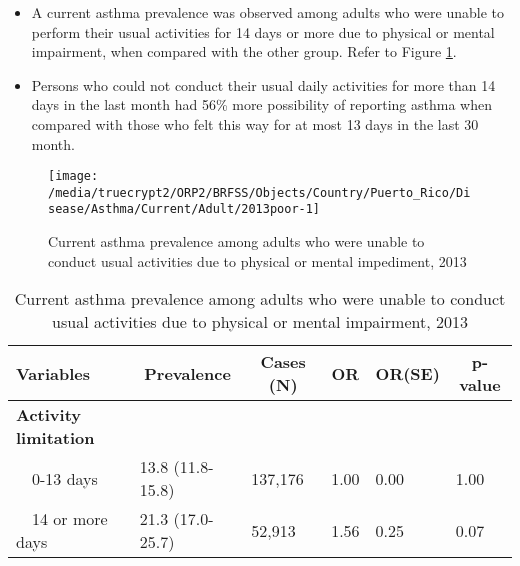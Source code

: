  \newpage
\begin{itemize}

\item A  
current asthma prevalence was observed among adults who were unable to perform their usual activities for 14 days or more due to physical or mental impairment, when compared with the other group. Refer to Figure \ref{fig:poor.Asthma.2013}.



\item Persons who could not conduct their usual daily activities for more than 14 days in the last month had 56\% more possibility of reporting asthma when compared with those who felt this way for at most 13 days in the last 30 month.

\end{itemize}

\begin{figure}[H]
\caption{Current asthma prevalence among adults who were unable to conduct usual activities due to physical or mental impediment, 2013}
\label{fig:poor.Asthma.2013}

\begin{knitrout}
\color{fgcolor}

{\centering \texttt{[image: /media/truecrypt2/ORP2/BRFSS/Objects/Country/Puerto\_Rico/Disease/Asthma/Current/Adult/2013poor-1]} 

}



\end{knitrout}
\end{figure}

\begin{table}[H]
\caption{Current asthma prevalence among adults who were unable to conduct usual activities due to physical or mental impairment, 2013\label{tab:poor.Asthma.2013}} 
\begin{center}
\begin{tabular}{llllll}
\hline\hline
\multicolumn{1}{l}{Variables}&\multicolumn{1}{c}{Prevalence}&\multicolumn{1}{c}{Cases (N)}&\multicolumn{1}{c}{OR}&\multicolumn{1}{c}{OR(SE)}&\multicolumn{1}{c}{p-value}\tabularnewline
\hline
{\bfseries Activity limitation}&&&&&\tabularnewline
~~0-13 days&13.8 (11.8-15.8)&137,176&1.00&0.00&1.00\tabularnewline
~~14 or more days&21.3 (17.0-25.7)& 52,913&1.56&0.25&0.07\tabularnewline
\hline
\end{tabular}\end{center}

\end{table}


